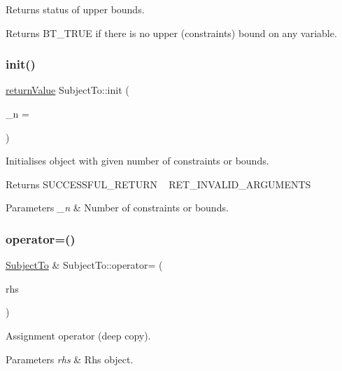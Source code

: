 Returns status of upper bounds. \begin{DoxyReturn}{Returns}
B\+T\+\_\+\+T\+R\+UE if there is no upper (constraints\textquotesingle{}) bound on any variable. 
\end{DoxyReturn}
\mbox{\label{class_subject_to_accb449a868cc9945b57bec00b40eea17}} 
\subsubsection{\texorpdfstring{init()}{init()}}
{\footnotesize\ttfamily \hyperlink{_message_handling_8hpp_a81d556f613bfbabd0b1f9488c0fa865e}{return\+Value} Subject\+To\+::init (\begin{DoxyParamCaption}\item[{\hyperlink{_types_8hpp_ab6fd6105e64ed14a0c9281326f05e623}{int\+\_\+t}}]{\+\_\+n = {} }\end{DoxyParamCaption})}

Initialises object with given number of constraints or bounds. \begin{DoxyReturn}{Returns}
S\+U\+C\+C\+E\+S\+S\+F\+U\+L\+\_\+\+R\+E\+T\+U\+RN ~\newline
 R\+E\+T\+\_\+\+I\+N\+V\+A\+L\+I\+D\+\_\+\+A\+R\+G\+U\+M\+E\+N\+TS 
\end{DoxyReturn}

\begin{DoxyParams}{Parameters}
{\em \+\_\+n} & Number of constraints or bounds. \\
\hline
\end{DoxyParams}
\mbox{\label{class_subject_to_a9dbd9042783ca87abf3404416e295d7e}} 
\subsubsection{\texorpdfstring{operator=()}{operator=()}}
{\footnotesize\ttfamily \hyperlink{class_subject_to}{Subject\+To} \& Subject\+To\+::operator= (\begin{DoxyParamCaption}\item[{const \hyperlink{class_subject_to}{Subject\+To} \&}]{rhs }\end{DoxyParamCaption})}

Assignment operator (deep copy). 
\begin{DoxyParams}{Parameters}
{\em rhs} & Rhs object. \\
\hline
\end{DoxyParams}
\mbox{\label{class_subject_to_a2fd214bb2d286f7ecbf29beb6787a984}} 
